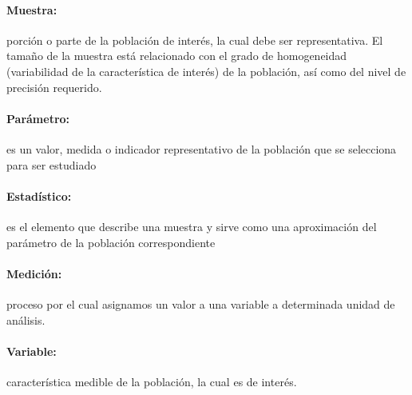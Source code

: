 \documentclass{article}
\begin{document}
\paragraph{Muestra:}
porción o parte de la población de interés, la cual debe ser representativa. El tamaño de la muestra está relacionado con el grado de homogeneidad (variabilidad de la característica de interés) de la población, así como del nivel de precisión requerido.

\paragraph{Parámetro:}
es un valor, medida o indicador representativo de la población que se selecciona para ser estudiado

\paragraph{Estadístico:}
es el elemento que describe una muestra y sirve como una aproximación del parámetro de la población correspondiente

\paragraph{Medición:}
proceso por el cual asignamos un valor a una variable a determinada unidad de análisis.

\paragraph{Variable:}
característica medible de la población, la cual es de interés.
\end{document}
